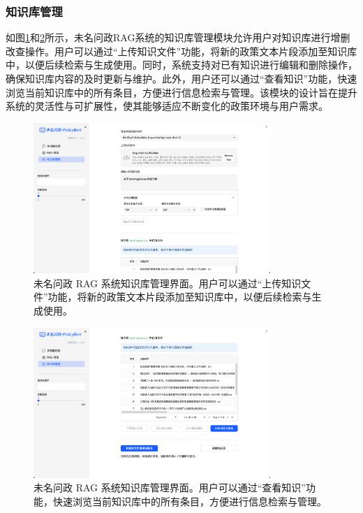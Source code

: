 \documentclass[12pt, a4paper]{ctexart}
\begin{document}
\subsubsection{知识库管理}
如图\ref{fig:kb_manage_1}和\ref{fig:kb_manage_2}所示，未名问政RAG系统的知识库管理模块允许用户对知识库进行增删改查操作。用户可以通过“上传知识文件”功能，将新的政策文本片段添加至知识库中，以便后续检索与生成使用。同时，系统支持对已有知识进行编辑和删除操作，确保知识库内容的及时更新与维护。此外，用户还可以通过“查看知识”功能，快速浏览当前知识库中的所有条目，方便进行信息检索与管理。该模块的设计旨在提升系统的灵活性与可扩展性，使其能够适应不断变化的政策环境与用户需求。

\begin{figure}[H]
    \centering
    \includegraphics[width=0.8\textwidth]{./images/kb_manage_1.png}
    \caption{未名问政 RAG 系统知识库管理界面。用户可以通过“上传知识文件”功能，将新的政策文本片段添加至知识库中，以便后续检索与生成使用。}
    \label{fig:kb_manage_1}
\end{figure}

\begin{figure}[H]
    \centering
    \includegraphics[width=0.8\textwidth]{./images/kb_manage_2.png}
    \caption{未名问政 RAG 系统知识库管理界面。用户可以通过“查看知识”功能，快速浏览当前知识库中的所有条目，方便进行信息检索与管理。}
    \label{fig:kb_manage_2}
\end{figure}
\end{document}
